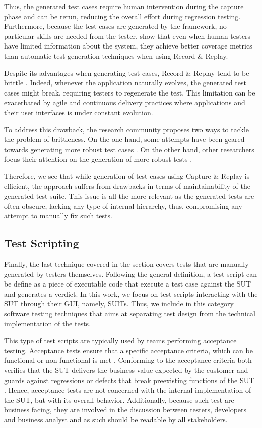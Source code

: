 Thus, the generated test cases require human intervention during the capture phase and can be rerun, reducing the overall effort during regression testing. Furthermore, because the test cases are generated by the framework, no particular skills are needed from the tester. \textcite{DiMartino2021} show that even when human testers have limited information about the system, they achieve better coverage metrics than automatic test generation techniques when using Record \& Replay.

Despite its advantages when generating test cases, Record \& Replay tend to be brittle \cite{Hammoudi2016}. Indeed, whenever the application naturally evolves, the generated test cases might break, requiring testers to regenerate the test. This limitation can be exacerbated by agile and continuous delivery practices where applications and their user interfaces is under constant evolution.

To address this drawback, the research community proposes two ways to tackle the problem of brittleness. On the one hand, some attempts have been geared towards generating more robust test cases \cite{Hammoudi2016b}. On the other hand, other researchers focus their attention on the generation of more robust tests \cite{Ronsse1999}.

Therefore, we see that while generation of test cases using Capture \& Replay is efficient, the approach suffers from drawbacks in terms of maintainability of the generated test suite. This issue is all the more relevant as the generated tests are often obscure, lacking any type of internal hierarchy, thus, compromising any attempt to manually fix such tests. 

\subsection{Test Scripting}
\label{sec:introduction-test-scripting}

Finally, the last technique covered in the section covers tests that are manually generated by testers themselves. Following the general definition, a test script can be define as a piece of executable code that execute a test case against the SUT and generates a verdict. In this work, we focus on test scripts interacting with the SUT through their GUI, namely, SUITs. Thus, we include in this category software testing techniques that aims at separating test design from the technical implementation of the tests.

This type of test scripts are typically used by teams performing acceptance testing. Acceptance tests ensure that a specific acceptance criteria, which can be functional or non-functional is met \cite{Pandit2015}. Conforming to the acceptance criteria both verifies that the SUT delivers the business value expected by the customer and guards against regressions or defects that break preexisting functions of the SUT \cite{Humble2010}. Hence, acceptance tests are not concerned with the internal implementation of the SUT, but with its overall behavior. Additionally, because such test are business facing, they are involved in the discussion between testers, developers and business analyst and as such should be readable by all stakeholders.

